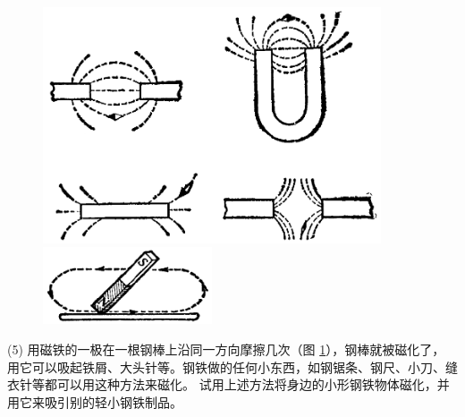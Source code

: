 \begin{figure}[htbp]
    \centering
    \begin{minipage}{10cm}
    \centering
    \includegraphics[width=10cm]{../pic/czwl2-ch10-14}
    \caption{}\label{fig:10-14}
    \end{minipage}
    \qquad
    \begin{minipage}{5cm}
    \centering
    \vspace{5cm}
    \includegraphics[width=5cm]{../pic/czwl2-ch10-15}
    \caption{}\label{fig:10-15}
    \end{minipage}
\end{figure}

(5) 用磁铁的一极在一根钢棒上沿同一方向摩擦几次（图 \ref{fig:10-15}），钢棒就被磁化了，
用它可以吸起铁屑、大头针等。钢铁做的任何小东西，如钢锯条、钢尺、小刀、缝衣针等都可以用这种方法来磁化。
试用上述方法将身边的小形钢铁物体磁化，并用它来吸引别的轻小钢铁制品。

